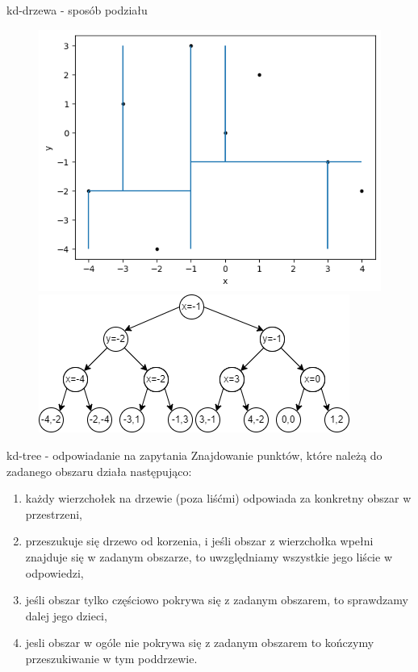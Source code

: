 \documentclass[aspectratio=169,dvipsnames]{beamer}
\begin{document}
\begin{frame}{kd-drzewa - sposób podziału}
    \begin{figure}[H]
        \centering
          \begin{minipage}{0.5\textwidth}
            \centering
            \includegraphics[width=\linewidth]{images/plots/8.png}
          \end{minipage}%
          \begin{minipage}{0.5\textwidth}
            \centering
            \includegraphics[width=\linewidth]{images/trees/12.drawio.png}
          \end{minipage}
    \end{figure}
\end{frame}

\begin{frame}{kd-tree - odpowiadanie na zapytania}
    Znajdowanie punktów, które należą do zadanego obszaru działa następująco:
    \begin{enumerate}
        \item<2-> każdy wierzchołek na drzewie (poza liśćmi) odpowiada za konkretny obszar w przestrzeni,
        \item<3-> przeszukuje się drzewo od korzenia, i jeśli obszar z wierzchołka wpełni znajduje się w zadanym obszarze, to uwzględniamy wszystkie jego liście w odpowiedzi,
        \item<4-> jeśli obszar tylko częściowo pokrywa się z zadanym obszarem, to sprawdzamy dalej jego dzieci,
        \item<5-> jesli obszar w ogóle nie pokrywa się z zadanym obszarem to kończymy przeszukiwanie w tym poddrzewie.
    \end{enumerate}
\end{frame}
\end{document}
